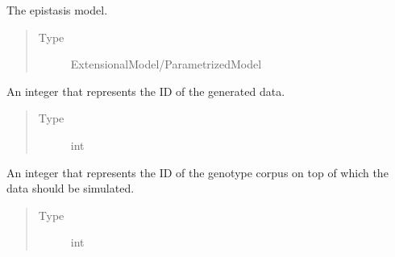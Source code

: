 \documentclass[a4paper,10pt,english]{sphinxhowto}
\begin{document}
\begin{fulllineitems}
\begin{fulllineitems}
\begin{quote}
\begin{description}
\end{description}\end{quote}

\end{fulllineitems}


\begin{fulllineitems}
\label{\detokenize{utils:utils.data_simulator.DataSimulator.model}}
The epistasis model.
\begin{quote}\begin{description}
\item[{Type}] \leavevmode
ExtensionalModel/ParametrizedModel

\end{description}\end{quote}

\end{fulllineitems}


\begin{fulllineitems}
\label{\detokenize{utils:utils.data_simulator.DataSimulator.sim_id}}
An integer that represents the ID of the generated data.
\begin{quote}\begin{description}
\item[{Type}] \leavevmode
int

\end{description}\end{quote}

\end{fulllineitems}


\begin{fulllineitems}
\label{\detokenize{utils:utils.data_simulator.DataSimulator.corpus_id}}
An integer that represents the ID of the genotype corpus on top of which
the data should be simulated.
\begin{quote}\begin{description}
\item[{Type}] \leavevmode
int


\end{description}
\end{quote}
\end{fulllineitems}
\end{fulllineitems}
\end{document}
